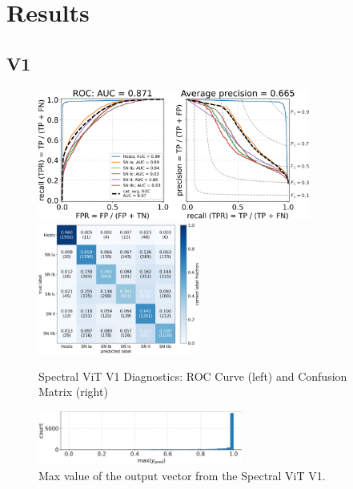 \chapter{Results}
\label{chap:chapter-4}

\section{V1}
\begin{figure}[t]
    \centering
    \includegraphics[height=4.3cm]{figures/v1_real/vit_model_V1_original_redorocfulle_e31.png}
    \quad
    \includegraphics[height=4.3cm]{figures/v1_real/vit_model_V1_original_redocmfull_e31.png}
    \caption{Spectral ViT V1 Diagnostics: ROC Curve (left) and Confusion Matrix (right)\label{fig:v1_qual}}
\end{figure}

\begin{figure}[b]
    \centering
    \includegraphics[width=0.6\textwidth]{figures/v1_real/vit_model_V1_original_redomax_ypred_binary_31.png}
    \caption{Max value of the output vector from the Spectral ViT V1.\label{fig:v1_max}}
\end{figure}



